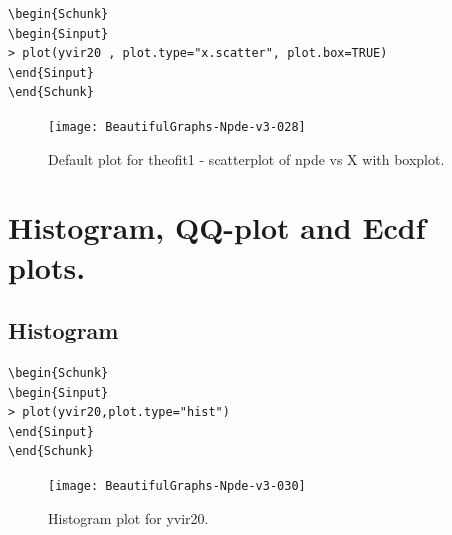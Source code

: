 \documentclass{report}
\begin{document}
\begin{lstlisting}[linerange=\\begin\{Sinput\}-\\end\{Sinput\}, includerangemarker=false]
\begin{Schunk}
\begin{Sinput}
> plot(yvir20 , plot.type="x.scatter", plot.box=TRUE)
\end{Sinput}
\end{Schunk}
\end{lstlisting}

\begin{figure}[H]
\caption{Default plot for theofit1 - scatterplot of npde vs X with boxplot.}
\label{fig:plotByDefault}
\centering
\texttt{[image: BeautifulGraphs-Npde-v3-028]}
\end{figure}

\section{Histogram, QQ-plot and Ecdf plots.}

\subsection{Histogram}

\begin{lstlisting}[linerange=\\begin\{Sinput\}-\\end\{Sinput\}, includerangemarker=false]
\begin{Schunk}
\begin{Sinput}
> plot(yvir20,plot.type="hist")
\end{Sinput}
\end{Schunk}
\end{lstlisting}


\begin{figure}[H]
\caption{Histogram plot for yvir20.}
\label{fig:Histogram_plot01_yvir20}
\centering
\texttt{[image: BeautifulGraphs-Npde-v3-030]}
\end{figure}
\end{document}
